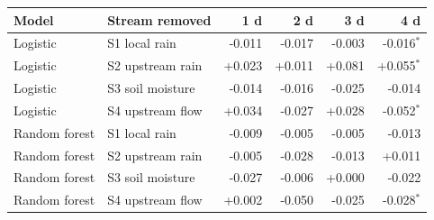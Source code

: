 \begin{tabular}{@{}llrrrr@{}}
\toprule
Model & Stream removed & 1 d & 2 d & 3 d & 4 d \\
\midrule
Logistic & S1 local rain & -0.011 & -0.017 & -0.003 & -0.016$^{*}$ \\
Logistic & S2 upstream rain & +0.023 & +0.011 & +0.081 & +0.055$^{*}$ \\
Logistic & S3 soil moisture & -0.014 & -0.016 & -0.025 & -0.014 \\
Logistic & S4 upstream flow & +0.034 & -0.027 & +0.028 & -0.052$^{*}$ \\
\midrule
Random forest & S1 local rain & -0.009 & -0.005 & -0.005 & -0.013 \\
Random forest & S2 upstream rain & -0.005 & -0.028 & -0.013 & +0.011 \\
Random forest & S3 soil moisture & -0.027 & -0.006 & +0.000 & -0.022 \\
Random forest & S4 upstream flow & +0.002 & -0.050 & -0.025 & -0.028$^{*}$ \\
\bottomrule
\end{tabular}
